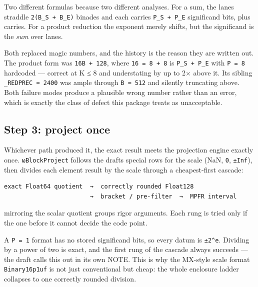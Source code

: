 Two different formulas because two different analyses. For a sum, the lanes straddle \texttt{2(B\_\allowbreak{}S + B\_\allowbreak{}E)} binades and each carries \texttt{P\_\allowbreak{}S + P\_\allowbreak{}E} significand bits, plus carries. For a product reduction the exponent merely shifts, but the significand is the \emph{sum} over lanes.



Both replaced magic numbers, and the history is the reason they are written out. The product form was \texttt{16B + 128}, where \texttt{16 = 8 + 8} is \texttt{P\_\allowbreak{}S + P\_\allowbreak{}E} with \texttt{P = 8} hardcoded — correct at K ≤ 8 and understating by up to 2× above it. Its sibling \texttt{\_\allowbreak{}REDPREC = 2400} was ample through \texttt{B ≈ 512} and silently truncating above. Both failure modes produce a plausible wrong number rather than an error, which is exactly the class of defect this package treats as unacceptable.



\subsection{Step 3: project once}



\label{2556693079189809503}{}


Whichever path produced it, the exact result meets the projection engine exactly once. \texttt{ωBlockProject} follows the draft{\textquotesingle}s special rows for the scale (NaN, \texttt{0}, \texttt{±Inf}), then divides each element result by the scale through a cheapest-first cascade:




\nopagebreak[4]
\begin{verbatim}
exact Float64 quotient  →  correctly rounded Float128
                        →  bracket / pre-filter  →  MPFR interval
\end{verbatim}



mirroring the scalar quotient group{\textquotesingle}s rigor arguments. Each rung is tried only if the one before it cannot decide the code point.



\begin{tcolorbox}[toptitle=-1mm,bottomtitle=1mm,colback=admonition-tip!50!white,colframe=admonition-tip,title=\textbf{P = 1 scales divide exactly, for free}]
A \texttt{P = 1} format has no stored significand bits, so every datum is \texttt{±2{\textasciicircum}e}. Dividing by a power of two is exact, and the first rung of the cascade always succeeds — the draft calls this out in its own NOTE. This is why the MX-style scale format \texttt{Binary16p1uf} is not just conventional but cheap: the whole enclosure ladder collapses to one correctly rounded division.

\end{tcolorbox}


